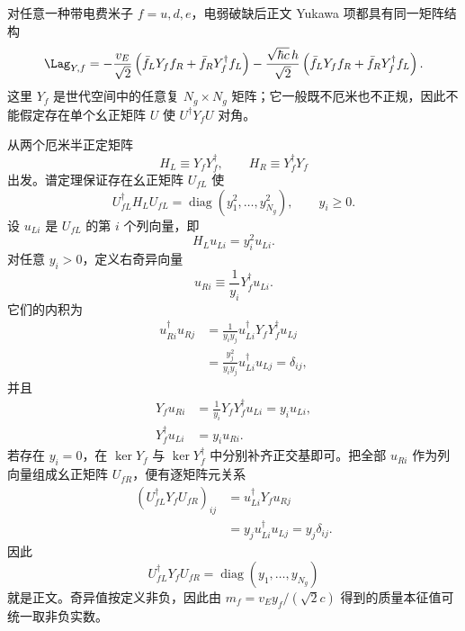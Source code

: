 \begin{derivation}
对任意一种带电费米子 $f=u,d,e$，电弱破缺后正文 Yukawa 项都具有同一矩阵结构
\begin{equation*}
 \Lag_{Y,f}
 =-\frac{v_E}{\sqrt2}
 \left(\bar f_LY_ff_R+\bar f_RY_f^\dagger f_L\right)
 -\frac{\sqrt{\hbar c}\,h}{\sqrt2}
 \left(\bar f_LY_ff_R+\bar f_RY_f^\dagger f_L\right).
\end{equation*}
这里 $Y_f$ 是世代空间中的任意复 $N_g\times N_g$ 矩阵；它一般既不厄米也不正规，因此不能假定存在单个幺正矩阵 $U$ 使 $U^\dagger Y_fU$ 对角。

从两个厄米半正定矩阵
\begin{equation*}
 H_L\equiv Y_fY_f^\dagger,
 \qquad
 H_R\equiv Y_f^\dagger Y_f
\end{equation*}
出发。谱定理保证存在幺正矩阵 $U_{fL}$ 使
\begin{equation*}
 U_{fL}^\dagger H_LU_{fL}
 =\operatorname{diag}(y_1^2,\ldots,y_{N_g}^2),
 \qquad y_i\ge0.
\end{equation*}
设 $u_{Li}$ 是 $U_{fL}$ 的第 $i$ 个列向量，即
\begin{equation*}
 H_Lu_{Li}=y_i^2u_{Li}.
\end{equation*}
对任意 $y_i>0$，定义右奇异向量
\begin{equation*}
 u_{Ri}\equiv\frac1{y_i}Y_f^\dagger u_{Li}.
\end{equation*}
它们的内积为
\begin{align*}
 u_{Ri}^\dagger u_{Rj}
 &=\frac1{y_iy_j}
 u_{Li}^\dagger Y_fY_f^\dagger u_{Lj}\\
 &=\frac{y_j^2}{y_iy_j}u_{Li}^\dagger u_{Lj}
 =\delta_{ij},
\end{align*}
并且
\begin{align*}
 Y_fu_{Ri}
 &=\frac1{y_i}Y_fY_f^\dagger u_{Li}
 =y_i u_{Li},\\
 Y_f^\dagger u_{Li}
 &=y_i u_{Ri}.
\end{align*}
若存在 $y_i=0$，在 $\ker Y_f$ 与 $\ker Y_f^\dagger$ 中分别补齐正交基即可。把全部 $u_{Ri}$ 作为列向量组成幺正矩阵 $U_{fR}$，便有逐矩阵元关系
\begin{align*}
 (U_{fL}^\dagger Y_fU_{fR})_{ij}
 &=u_{Li}^\dagger Y_fu_{Rj}\\
 &=y_j u_{Li}^\dagger u_{Lj}
 =y_j\delta_{ij}.
\end{align*}
因此
\begin{equation*}
 \boxed{
 U_{fL}^\dagger Y_fU_{fR}
 =\operatorname{diag}(y_1,\ldots,y_{N_g})}
\end{equation*}
就是正文。奇异值按定义非负，因此由 $m_f=v_E y_f/(\sqrt2 c)$ 得到的质量本征值可统一取非负实数。


\end{derivation}

